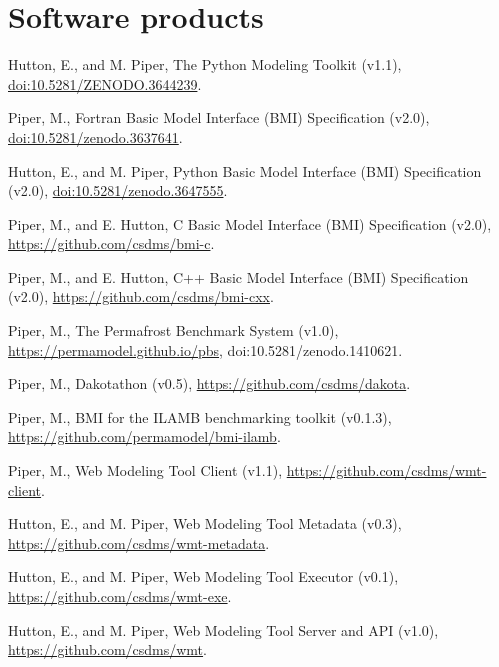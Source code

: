 \section{Software products}
\vspace{0.5em}

\begin{enumerate}[{[}1{]}]

  \item Hutton, E., and M. Piper, The Python Modeling Toolkit
    (v1.1), \url{doi:10.5281/ZENODO.3644239}.

  \item Piper, M., Fortran Basic Model Interface (BMI) Specification (v2.0),
    \url{doi:10.5281/zenodo.3637641}.

  \item Hutton, E., and M. Piper, Python Basic Model Interface (BMI)
    Specification (v2.0), \url{doi:10.5281/zenodo.3647555}.

  \item Piper, M., and E. Hutton, C Basic Model Interface (BMI)
    Specification (v2.0), \url{https://github.com/csdms/bmi-c}.

  \item Piper, M., and E. Hutton, C++ Basic Model Interface (BMI)
    Specification (v2.0), \url{https://github.com/csdms/bmi-cxx}.

  \item Piper, M., The Permafrost Benchmark System (v1.0),
    \url{https://permamodel.github.io/pbs},
    {doi:10.5281/zenodo.1410621}.

  \item Piper, M., Dakotathon (v0.5),
    \url{https://github.com/csdms/dakota}.

  \item Piper, M., BMI for the ILAMB benchmarking toolkit (v0.1.3),
    \url{https://github.com/permamodel/bmi-ilamb}.

  \item Piper, M., Web Modeling Tool Client (v1.1),
    \url{https://github.com/csdms/wmt-client}.

  \item Hutton, E., and M. Piper, Web Modeling Tool Metadata (v0.3),
    \url{https://github.com/csdms/wmt-metadata}.

  \item Hutton, E., and M. Piper, Web Modeling Tool Executor (v0.1),
    \url{https://github.com/csdms/wmt-exe}.

  \item Hutton, E., and M. Piper, Web Modeling Tool Server and API (v1.0),
    \url{https://github.com/csdms/wmt}.


\end{enumerate}
